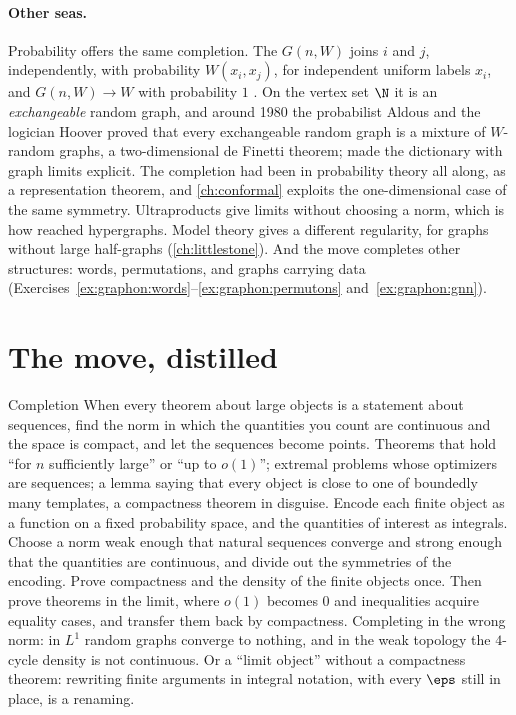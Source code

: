 \begin{refsection}
\paragraph{Other seas.} Probability offers the same completion. The  $G(n,W)$ joins $i$ and $j$, independently, with probability $W(x_i,x_j)$, for independent uniform labels $x_i$, and $G(n,W)\to W$ with probability $1$ \parencite{LovaszSzegedy2006}. On the vertex set $\N$ it is an \emph{exchangeable} random graph, and around 1980 the probabilist Aldous and the logician Hoover proved that every exchangeable random graph is a mixture of $W$-random graphs, a two-dimensional de Finetti theorem; \textcite{DiaconisJanson2008} made the dictionary with graph limits explicit. The completion had been in probability theory all along, as a representation theorem, and \cref{ch:conformal} exploits the one-dimensional case of the same symmetry. Ultraproducts give limits without choosing a norm, which is how \textcite{ElekSzegedy2012} reached hypergraphs. Model theory gives a different regularity, for graphs without large half-graphs (\cref{ch:littlestone}). And the move completes other structures: words, permutations, and graphs carrying data (Exercises~\ref{ex:graphon:words}--\ref{ex:graphon:permutons} and~\ref{ex:graphon:gnn}).

\section{The move, distilled}\label{sec:graphon:distilled}

\begin{move}{Completion}
 When every theorem about large objects is a statement about sequences, find the norm in which the quantities you count are continuous and the space is compact, and let the sequences become points.
 Theorems that hold ``for $n$ sufficiently large'' or ``up to $o(1)$''; extremal problems whose optimizers are sequences; a lemma saying that every object is close to one of boundedly many templates, a compactness theorem in disguise.
 Encode each finite object as a function on a fixed probability space, and the quantities of interest as integrals. Choose a norm weak enough that natural sequences converge and strong enough that the quantities are continuous, and divide out the symmetries of the encoding. Prove compactness and the density of the finite objects once. Then prove theorems in the limit, where $o(1)$ becomes $0$ and inequalities acquire equality cases, and transfer them back by compactness.
 Completing in the wrong norm: in $L^1$ random graphs converge to nothing, and in the weak topology the $4$-cycle density is not continuous. Or a ``limit object'' without a compactness theorem: rewriting finite arguments in integral notation, with every $\eps$ still in place, is a renaming.
\end{move}


\end{refsection}
